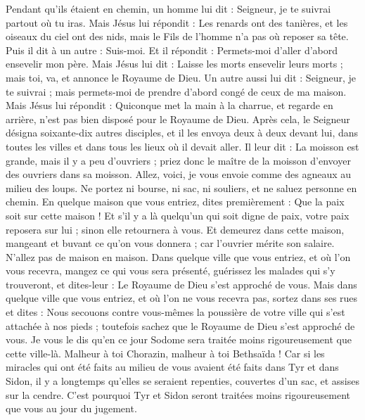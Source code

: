 \begin{multicols}{2}
Pendant qu'ils étaient en chemin, un homme lui dit : Seigneur, je te suivrai partout où tu iras.
Mais Jésus lui répondit : Les renards ont des tanières, et les oiseaux du ciel ont des nids, mais le Fils de l'homme n'a pas où reposer sa tête.
Puis il dit à un autre : Suis-moi. Et il répondit : Permets-moi d'aller d'abord ensevelir mon père.
Mais Jésus lui dit : Laisse les morts ensevelir leurs morts ; mais toi, va, et annonce le Royaume de Dieu.
Un autre aussi lui dit : Seigneur, je te suivrai ; mais permets-moi de prendre d'abord congé de ceux de ma maison.
Mais Jésus lui répondit : Quiconque met la main à la charrue, et regarde en arrière, n'est pas bien disposé pour le Royaume de Dieu.
\VerseOne{}Après cela, le Seigneur désigna soixante-dix autres disciples, et il les envoya deux à deux devant lui, dans toutes les villes et dans tous les lieux où il devait aller.
Il leur dit : La moisson est grande, mais il y a peu d'ouvriers ; priez donc le maître de la moisson d'envoyer des ouvriers dans sa moisson.
Allez, voici, je vous envoie comme des agneaux au milieu des loups.
Ne portez ni bourse, ni sac, ni souliers, et ne saluez personne en chemin.
En quelque maison que vous entriez, dites premièrement : Que la paix soit sur cette maison !
Et s'il y a là quelqu'un qui soit digne de paix, votre paix reposera sur lui ; sinon elle retournera à vous.
Et demeurez dans cette maison, mangeant et buvant ce qu'on vous donnera ; car l'ouvrier mérite son salaire. N'allez pas de maison en maison.
Dans quelque ville que vous entriez, et où l'on vous recevra, mangez ce qui vous sera présenté,
guérissez les malades qui s'y trouveront, et dites-leur : Le Royaume de Dieu s'est approché de vous.
Mais dans quelque ville que vous entriez, et où l'on ne vous recevra pas, sortez dans ses rues et dites :
Nous secouons contre vous-mêmes la poussière de votre ville qui s'est attachée à nos pieds ; toutefois sachez que le Royaume de Dieu s'est approché de vous.
Je vous le dis qu'en ce jour Sodome sera traitée moins rigoureusement que cette ville-là.
Malheur à toi Chorazin, malheur à toi Bethsaïda ! Car si les miracles qui ont été faits au milieu de vous avaient été faits dans Tyr et dans Sidon, il y a longtemps qu'elles se seraient repenties, couvertes d'un sac, et assises sur la cendre.
C'est pourquoi Tyr et Sidon seront traitées moins rigoureusement que vous au jour du jugement.

\end{multicols}
